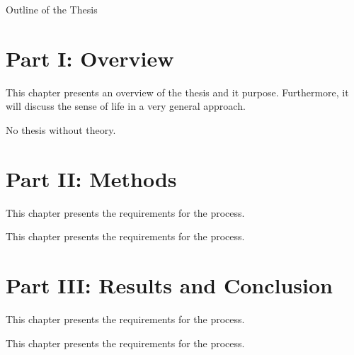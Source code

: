 \clearemptydoublepage

{}

\begin{center}
	\huge{Outline of the Thesis}
\end{center}




\section*{Part I: Overview}

  \vspace{1mm}

\noindent  This chapter presents an overview of the thesis and it purpose. Furthermore, it will discuss the sense of life in a very general approach.  \\

  \vspace{1mm}

\noindent  No thesis without theory.   \\

\section*{Part II: Methods}

  \vspace{1mm}

\noindent  This chapter presents the requirements for the process.


  \vspace{1mm}

\noindent  This chapter presents the requirements for the process.

\section*{Part III: Results and Conclusion}

  \vspace{1mm}

\noindent  This chapter presents the requirements for the process.

  \vspace{1mm}

\noindent  This chapter presents the requirements for the process.